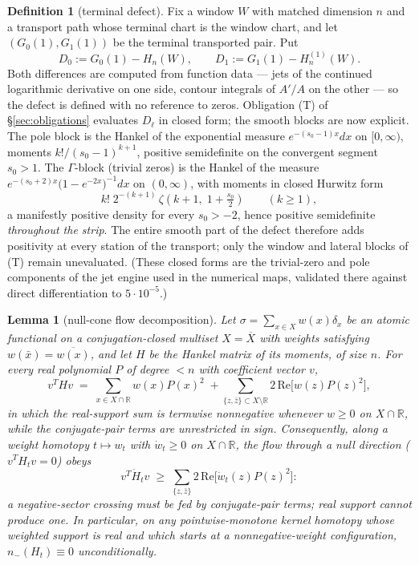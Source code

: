 \documentclass[11pt]{article}
\theoremstyle{plain}
\newtheorem{lemma}[theorem]{Lemma}
\theoremstyle{definition}
\newtheorem{definition}[theorem]{Definition}
\theoremstyle{remark}
\newcommand{\R}{\mathbb{R}}
\begin{document}
\begin{definition}[terminal defect]\label{def:defect}
Fix a window $W$ with matched dimension $n$ and a transport path whose terminal chart is
the window chart, and let $(G_0(1),G_1(1))$ be the terminal transported pair. Put
\[
  D_0 := G_0(1)-H_n(W),\qquad D_1 := G_1(1)-H^{(1)}_n(W).
\]
Both differences are computed from function data --- jets of the continued logarithmic
derivative on one side, contour integrals of $A'/A$ on the other --- so the defect is
defined with no reference to zeros. Obligation (T) of \S\ref{sec:obligations} evaluates
$D_\ell$ in closed form; the smooth blocks are now explicit. The pole block is the
Hankel of the exponential measure $e^{-(s_0-1)x}dx$ on $[0,\infty)$, moments
$k!/(s_0-1)^{k+1}$, positive semidefinite on the convergent segment $s_0>1$. The
$\Gamma$-block (trivial zeros) is the Hankel of the measure
$e^{-(s_0+2)x}\bigl(1-e^{-2x}\bigr)^{-1}dx$ on $(0,\infty)$, with moments in closed
Hurwitz form
\[
  k!\;2^{-(k+1)}\,\zeta\!\left(k+1,\;1+\tfrac{s_0}2\right)\qquad(k\ge1),
\]
a manifestly positive density for every $s_0>-2$, hence positive semidefinite
\emph{throughout the strip}. The entire smooth part of the defect therefore adds
positivity at every station of the transport; only the window and lateral blocks of
(T) remain unevaluated. (These closed forms are the trivial-zero and pole components
of the jet engine used in the numerical maps, validated there against direct
differentiation to $5\cdot10^{-5}$.)
\end{definition}

\begin{lemma}[null-cone flow decomposition]\label{lem:nullflow}
Let $\sigma=\sum_{x\in X}w(x)\delta_x$ be an atomic functional on a conjugation-closed
multiset $X=\overline X$ with weights satisfying $w(\bar x)=\overline{w(x)}$, and let
$H$ be the Hankel matrix of its moments, of size $n$. For every real polynomial $P$ of
degree $<n$ with coefficient vector $v$,
\[
  v^{T}Hv \;=\; \sum_{x\in X\cap\R}w(x)P(x)^{2}
  \;+\!\!\sum_{\{z,\bar z\}\subset X\setminus\R}\!\!2\,\mathrm{Re}\bigl[w(z)P(z)^{2}\bigr],
\]
in which the real-support sum is termwise nonnegative whenever $w\ge0$ on $X\cap\R$,
while the conjugate-pair terms are unrestricted in sign. Consequently, along a weight
homotopy $t\mapsto w_t$ with $\dot w_t\ge0$ on $X\cap\R$, the flow through a null
direction ($v^{T}H_tv=0$) obeys
\[
  v^{T}\dot H_tv \;\ge\; \sum_{\{z,\bar z\}}2\,\mathrm{Re}\bigl[\dot w_t(z)P(z)^{2}\bigr]:
\]
a negative-sector crossing must be fed by conjugate-pair terms; real support cannot
produce one. In particular, on any pointwise-monotone kernel homotopy whose weighted
support is real and which starts at a nonnegative-weight configuration,
$n_-(H_t)\equiv0$ unconditionally.
\end{lemma}
\end{document}
